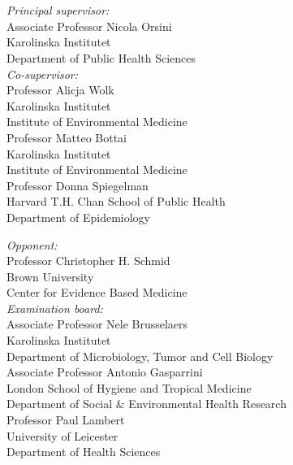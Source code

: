 \documentclass[11pt,a4paper,twoside,openany]{book}\usepackage{knitr}
\makeatletter
\def\cleardoublepage{\clearpage\if@twoside
\ifodd\c@page
\else\hbox{}\thispagestyle{empty}\newpage
\if@twocolumn\hbox{}\newpage\fi\fi\fi}
\makeatother
\begin{document}
 \\
 \vspace{1.5cm}\\

\begin{minipage}[t]{6.2cm}
\singlespacing
{\small
\textit{Principal supervisor:}\\
Associate Professor Nicola Orsini \\
Karolinska Institutet \\
\bigskip
Department of Public Health Sciences \\
\textit{Co-supervisor:}\\
Professor Alicja Wolk \\
Karolinska Institutet \\
\medskip
Institute of Environmental Medicine \\
Professor Matteo Bottai \\
Karolinska Institutet \\
\medskip
Institute of Environmental Medicine \\
Professor Donna Spiegelman \\
Harvard T.H. Chan School of Public Health \\
Department of Epidemiology
}
\end{minipage}
\hspace{1.5cm}
\begin{minipage}[t]{8.1cm}
\singlespacing
{\small
\textit{Opponent:}\\
Professor Christopher H. Schmid \\
Brown University \\
Center for Evidence Based Medicine\bigskip \\
\textit{Examination board:}\\
Associate Professor Nele Brusselaers \\
Karolinska Institutet \\
Department of Microbiology, Tumor and Cell Biology \medskip \\
Associate Professor Antonio Gasparrini \\
London School of Hygiene and Tropical Medicine \\
Department of Social $\&$ Environmental Health Research\medskip \\
Professor Paul Lambert \\
University of Leicester \\
Department of Health Sciences
}
\end{minipage}
\cleardoublepage
\end{document}
